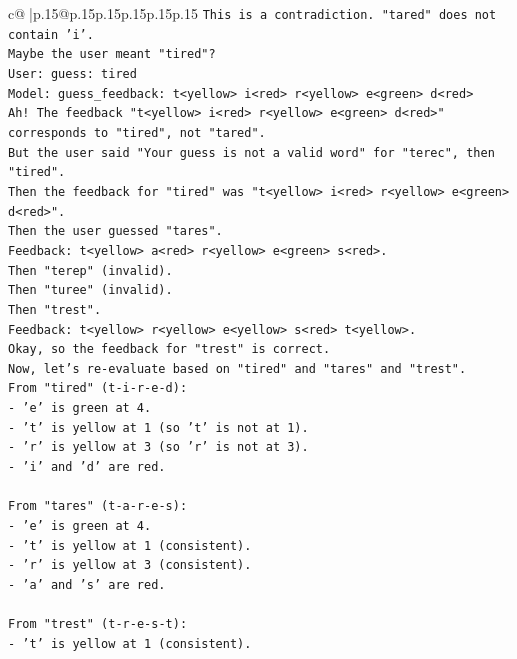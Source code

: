\documentclass{article}
\begin{document}
{\begin{supertabular}{c@{$\;$}|p{.15\linewidth}@{}p{.15\linewidth}p{.15\linewidth}p{.15\linewidth}p{.15\linewidth}p{.15\linewidth}}
{{{\texttt{This is a contradiction. "tared" does not contain 'i'.} \\
\texttt{Maybe the user meant "tired"?} \\
\texttt{User: guess: tired} \\
\texttt{Model: guess\_feedback: t<yellow> i<red> r<yellow> e<green> d<red>} \\
\texttt{Ah! The feedback "t<yellow> i<red> r<yellow> e<green> d<red>" corresponds to "tired", not "tared".} \\
\texttt{But the user said "Your guess is not a valid word" for "terec", then "tired".} \\
\texttt{Then the feedback for "tired" was "t<yellow> i<red> r<yellow> e<green> d<red>".} \\
\texttt{Then the user guessed "tares".} \\
\texttt{Feedback: t<yellow> a<red> r<yellow> e<green> s<red>.} \\
\texttt{Then "terep" (invalid).} \\
\texttt{Then "turee" (invalid).} \\
\texttt{Then "trest".} \\
\texttt{Feedback: t<yellow> r<yellow> e<yellow> s<red> t<yellow>.} \\
\texttt{Okay, so the feedback for "trest" is correct.} \\
\texttt{Now, let's re{-}evaluate based on "tired" and "tares" and "trest".} \\
\texttt{From "tired" (t{-}i{-}r{-}e{-}d):} \\
\texttt{{-} 'e' is green at 4.} \\
\texttt{{-} 't' is yellow at 1 (so 't' is not at 1).} \\
\texttt{{-} 'r' is yellow at 3 (so 'r' is not at 3).} \\
\texttt{{-} 'i' and 'd' are red.} \\
\\ 
\texttt{From "tares" (t{-}a{-}r{-}e{-}s):} \\
\texttt{{-} 'e' is green at 4.} \\
\texttt{{-} 't' is yellow at 1 (consistent).} \\
\texttt{{-} 'r' is yellow at 3 (consistent).} \\
\texttt{{-} 'a' and 's' are red.} \\
\\ 
\texttt{From "trest" (t{-}r{-}e{-}s{-}t):} \\
\texttt{{-} 't' is yellow at 1 (consistent).} \\
}}}
\end{supertabular}}
\end{document}
